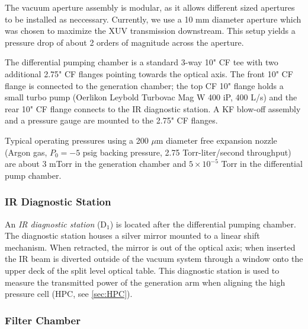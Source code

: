 The vacuum aperture assembly is modular, as it allows different sized apertures to be installed as neccessary. Currently, we use a 10 mm diameter aperture which was chosen to maximize the XUV transmission downstream. This setup yields a pressure drop of about 2 orders of magnitude across the aperture.

The differential pumping chamber is a standard 3-way 10" CF tee with two additional 2.75" CF flanges pointing towards the optical axis. The front 10" CF flange is connected to the generation chamber; the top CF 10" flange holds a small turbo pump (Oerlikon Leybold Turbovac Mag W 400 iP, 400 L/s) and the rear 10" CF flange connects to the IR diagnostic station. A KF blow-off assembly and a pressure gauge are mounted to the 2.75" CF flanges.

Typical operating pressures using a 200 $\mu$m diameter free expansion nozzle (Argon gas, $P_0 = -5$ psig backing pressure, 2.75 Torr-liter/second throughput) are about 3 mTorr in the generation chamber and $5 \times 10^{-5}$ Torr in the differential pump chamber.

\subsubsection{IR Diagnostic Station}

An \textit{IR diagnostic station} (D$_1$) is located after the differential pumping chamber. The diagnostic station houses a silver mirror mounted to a linear shift mechanism. When retracted, the mirror is out of the optical axis; when inserted the IR beam is diverted outside of the vacuum system through a window onto the upper deck of the split level optical table. This diagnostic station is used to measure the transmitted power of the generation arm when aligning the high pressure cell (HPC, see \cref{sec:HPC}).

\subsubsection{Filter Chamber}
\label{sec:filter_chamber}

